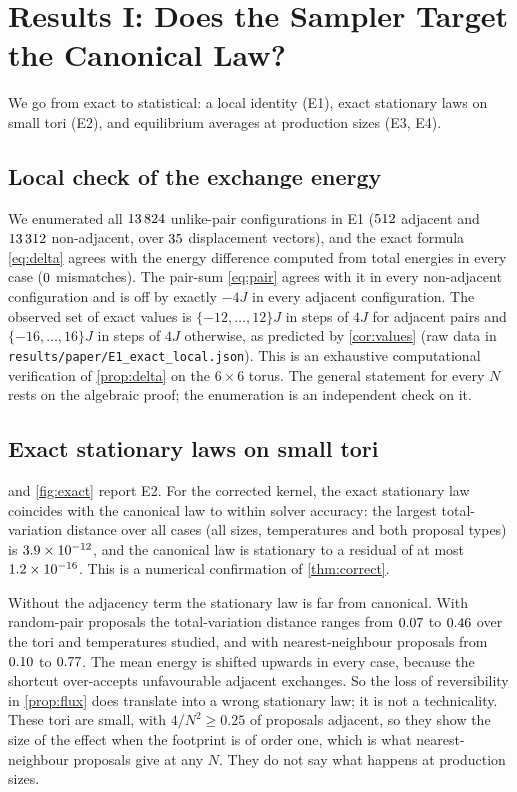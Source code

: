 \section{Results I: Does the Sampler Target the Canonical Law?}
\label{sec:results}
We go from exact to statistical: a local identity (E1), exact stationary laws on small tori (E2), and equilibrium averages at production sizes (E3, E4).

\subsection{Local check of the exchange energy}
\label{sec:results-local}
We enumerated all $13\,824$ unlike-pair configurations in E1 ($512$ adjacent and $13\,312$ non-adjacent, over $35$ displacement vectors), and the exact formula \eqref{eq:delta} agrees with the energy difference computed from total energies in every case ($0$ mismatches). The pair-sum \eqref{eq:pair} agrees with it in every non-adjacent configuration and is off by exactly $-4J$ in every adjacent configuration. The observed set of exact values is $\{-12,\dots,12\}J$ in steps of $4J$ for adjacent pairs and $\{-16,\dots,16\}J$ in steps of $4J$ otherwise, as predicted by \cref{cor:values} (raw data in \texttt{results/paper/E1\_exact\_local.json}). This is an exhaustive computational verification of \cref{prop:delta} on the $6\times6$ torus. The general statement for every $N$ rests on the algebraic proof; the enumeration is an independent check on it.

\subsection{Exact stationary laws on small tori}
\label{sec:results-exact}
 and \cref{fig:exact} report E2. For the corrected kernel, the exact stationary law coincides with the canonical law to within solver accuracy: the largest total-variation distance over all cases (all sizes, temperatures and both proposal types) is $3.9\times10^{-12}$, and the canonical law is stationary to a residual of at most $1.2\times10^{-16}$. This is a numerical confirmation of \cref{thm:correct}.

Without the adjacency term the stationary law is far from canonical. With random-pair proposals the total-variation distance ranges from $0.07$ to $0.46$ over the tori and temperatures studied, and with nearest-neighbour proposals from $0.10$ to $0.77$. The mean energy is shifted upwards in every case, because the shortcut over-accepts unfavourable adjacent exchanges. So the loss of reversibility in \cref{prop:flux} does translate into a wrong stationary law; it is not a technicality. These tori are small, with $4/N^2\ge0.25$ of proposals adjacent, so they show the size of the effect when the footprint is of order one, which is what nearest-neighbour proposals give at any $N$. They do not say what happens at production sizes.


